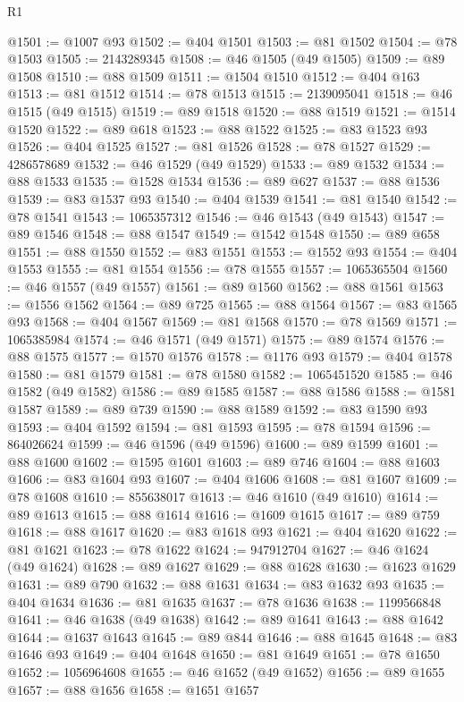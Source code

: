 \begin{lexlean}{R1}
\begin{coremodule}
@1501 := @1007 @93
@1502 := @404 @1501
@1503 := @81 @1502
@1504 := @78 @1503
@1505 := 2143289345
@1508 := @46 @1505 (@49 @1505)
@1509 := @89 @1508
@1510 := @88 @1509
@1511 := @1504 @1510
@1512 := @404 @163
@1513 := @81 @1512
@1514 := @78 @1513
@1515 := 2139095041
@1518 := @46 @1515 (@49 @1515)
@1519 := @89 @1518
@1520 := @88 @1519
@1521 := @1514 @1520
@1522 := @89 @618
@1523 := @88 @1522
@1525 := @83 @1523 @93
@1526 := @404 @1525
@1527 := @81 @1526
@1528 := @78 @1527
@1529 := 4286578689
@1532 := @46 @1529 (@49 @1529)
@1533 := @89 @1532
@1534 := @88 @1533
@1535 := @1528 @1534
@1536 := @89 @627
@1537 := @88 @1536
@1539 := @83 @1537 @93
@1540 := @404 @1539
@1541 := @81 @1540
@1542 := @78 @1541
@1543 := 1065357312
@1546 := @46 @1543 (@49 @1543)
@1547 := @89 @1546
@1548 := @88 @1547
@1549 := @1542 @1548
@1550 := @89 @658
@1551 := @88 @1550
@1552 := @83 @1551
@1553 := @1552 @93
@1554 := @404 @1553
@1555 := @81 @1554
@1556 := @78 @1555
@1557 := 1065365504
@1560 := @46 @1557 (@49 @1557)
@1561 := @89 @1560
@1562 := @88 @1561
@1563 := @1556 @1562
@1564 := @89 @725
@1565 := @88 @1564
@1567 := @83 @1565 @93
@1568 := @404 @1567
@1569 := @81 @1568
@1570 := @78 @1569
@1571 := 1065385984
@1574 := @46 @1571 (@49 @1571)
@1575 := @89 @1574
@1576 := @88 @1575
@1577 := @1570 @1576
@1578 := @1176 @93
@1579 := @404 @1578
@1580 := @81 @1579
@1581 := @78 @1580
@1582 := 1065451520
@1585 := @46 @1582 (@49 @1582)
@1586 := @89 @1585
@1587 := @88 @1586
@1588 := @1581 @1587
@1589 := @89 @739
@1590 := @88 @1589
@1592 := @83 @1590 @93
@1593 := @404 @1592
@1594 := @81 @1593
@1595 := @78 @1594
@1596 := 864026624
@1599 := @46 @1596 (@49 @1596)
@1600 := @89 @1599
@1601 := @88 @1600
@1602 := @1595 @1601
@1603 := @89 @746
@1604 := @88 @1603
@1606 := @83 @1604 @93
@1607 := @404 @1606
@1608 := @81 @1607
@1609 := @78 @1608
@1610 := 855638017
@1613 := @46 @1610 (@49 @1610)
@1614 := @89 @1613
@1615 := @88 @1614
@1616 := @1609 @1615
@1617 := @89 @759
@1618 := @88 @1617
@1620 := @83 @1618 @93
@1621 := @404 @1620
@1622 := @81 @1621
@1623 := @78 @1622
@1624 := 947912704
@1627 := @46 @1624 (@49 @1624)
@1628 := @89 @1627
@1629 := @88 @1628
@1630 := @1623 @1629
@1631 := @89 @790
@1632 := @88 @1631
@1634 := @83 @1632 @93
@1635 := @404 @1634
@1636 := @81 @1635
@1637 := @78 @1636
@1638 := 1199566848
@1641 := @46 @1638 (@49 @1638)
@1642 := @89 @1641
@1643 := @88 @1642
@1644 := @1637 @1643
@1645 := @89 @844
@1646 := @88 @1645
@1648 := @83 @1646 @93
@1649 := @404 @1648
@1650 := @81 @1649
@1651 := @78 @1650
@1652 := 1056964608
@1655 := @46 @1652 (@49 @1652)
@1656 := @89 @1655
@1657 := @88 @1656
@1658 := @1651 @1657

\end{coremodule}
\end{lexlean}

